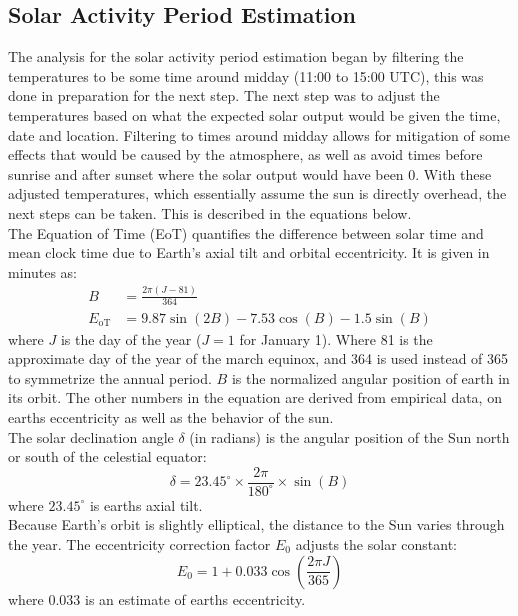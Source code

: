 \subsection{Solar Activity Period Estimation}
The analysis for the solar activity period estimation began by filtering the temperatures to be some time around midday (11:00 to 15:00 UTC), this was done in preparation for the next step. The next step was to adjust the temperatures based on what the expected solar output would be given the time, date and location. Filtering to times around midday allows for mitigation of some effects that would be caused by the atmosphere, as well as avoid times before sunrise and after sunset where the solar output would have been 0. With these adjusted temperatures, which essentially assume the sun is directly overhead, the next steps can be taken. This is described in the equations below.\\

The Equation of Time (EoT) quantifies the difference between solar time and mean clock time due to Earth's axial tilt and orbital eccentricity.  
It is given in minutes as:
\begin{align}
    B &= \frac{2\pi (J - 81)}{364} \label{eq:B} \\
    E_{\mathrm{oT}} &= 9.87 \sin(2B) - 7.53 \cos(B) - 1.5 \sin(B) \label{eq:EoT}
\end{align}
where \( J \) is the day of the year (\( J=1 \) for January 1). Where 81 is the approximate day of the year of the march equinox, and 364 is used instead of 365 to symmetrize the annual period.  \( B \) is the normalized angular position of earth in its orbit. The other numbers in the equation are derived from empirical data, on earths eccentricity as well as the behavior of the sun.\\

The solar declination angle \( \delta \) (in radians) is the angular position of the Sun north or south of the celestial equator:
\begin{equation}
    \delta = 23.45^\circ \times \frac{2\pi}{180^\circ} \times 
    \sin\!\left( B \right)
\end{equation}
where \(23.45^\circ\) is earths axial tilt.\\

Because Earth's orbit is slightly elliptical, the distance to the Sun varies through the year.  
The eccentricity correction factor \( E_0 \) adjusts the solar constant:
\begin{equation}
    E_0 = 1 + 0.033 \cos\!\left( \frac{2\pi J}{365} \right)
\end{equation}
where 0.033 is an estimate of earths eccentricity.\\

